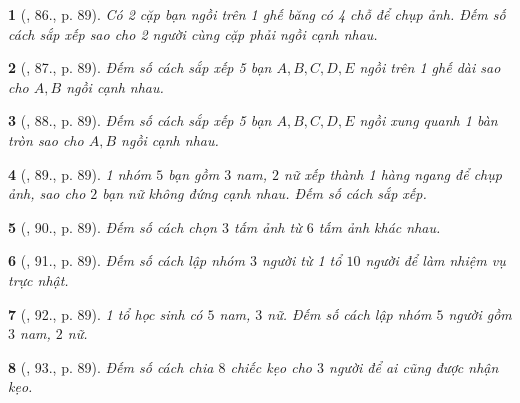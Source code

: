 \documentclass{article}
\newtheorem{baitoan}{}
\begin{document}
\begin{baitoan}[\cite{Binh_Toan_6_tap_2}, 86., p. 89]
	Có 2 cặp bạn ngồi trên 1 ghế băng có 4 chỗ để chụp ảnh. Đếm số cách sắp xếp sao cho 2 người cùng cặp phải ngồi cạnh nhau.
\end{baitoan}

\begin{baitoan}[\cite{Binh_Toan_6_tap_2}, 87., p. 89]
	Đếm số cách sắp xếp 5 bạn $A,B,C,D,E$ ngồi trên 1 ghế dài sao cho $A,B$ ngồi cạnh nhau.
\end{baitoan}

\begin{baitoan}[\cite{Binh_Toan_6_tap_2}, 88., p. 89]
	Đếm số cách sắp xếp 5 bạn $A,B,C,D,E$ ngồi xung quanh 1 bàn tròn sao cho $A,B$ ngồi cạnh nhau.
\end{baitoan}

\begin{baitoan}[\cite{Binh_Toan_6_tap_2}, 89., p. 89]
	1 nhóm $5$ bạn gồm $3$ nam, $2$ nữ xếp thành 1 hàng ngang để chụp ảnh, sao cho $2$ bạn nữ không đứng cạnh nhau. Đếm số cách sắp xếp.
\end{baitoan}

\begin{baitoan}[\cite{Binh_Toan_6_tap_2}, 90., p. 89]
	Đếm số cách chọn $3$ tấm ảnh từ $6$ tấm ảnh khác nhau.
\end{baitoan}

\begin{baitoan}[\cite{Binh_Toan_6_tap_2}, 91., p. 89]
	Đếm số cách lập nhóm $3$ người từ 1 tổ $10$ người để làm nhiệm vụ trực nhật.
\end{baitoan}

\begin{baitoan}[\cite{Binh_Toan_6_tap_2}, 92., p. 89]
	1 tổ học sinh có $5$ nam, $3$ nữ. Đếm số cách lập nhóm $5$ người gồm $3$ nam, $2$ nữ.
\end{baitoan}

\begin{baitoan}[\cite{Binh_Toan_6_tap_2}, 93., p. 89]
	Đếm số cách chia $8$ chiếc kẹo cho $3$ người để ai cũng được nhận kẹo.
\end{baitoan}


\printbibliography[heading=bibintoc]
	
\end{document}
